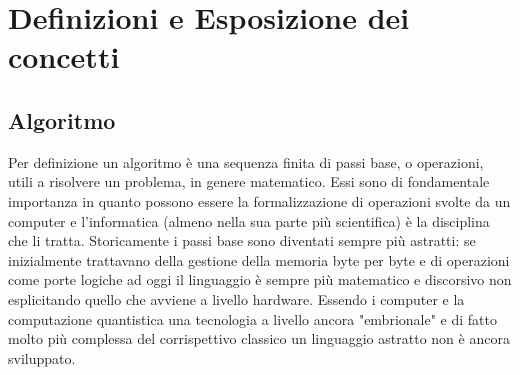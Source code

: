\section{Definizioni e Esposizione dei concetti}
\subsection{Algoritmo}
Per definizione un algoritmo è una sequenza finita di passi base, o operazioni, utili a risolvere un problema, in genere matematico. Essi sono di fondamentale importanza in quanto possono essere la formalizzazione di operazioni svolte da un computer e l'informatica (almeno nella sua parte più scientifica) è la disciplina che li tratta. Storicamente i passi base sono diventati sempre più astratti: se inizialmente trattavano della gestione della memoria byte per byte e di operazioni come porte logiche ad oggi il linguaggio è sempre più matematico e discorsivo non esplicitando quello che avviene a livello hardware. Essendo i computer e la computazione quantistica una tecnologia a livello ancora "embrionale" e di fatto molto più complessa del corrispettivo classico un linguaggio astratto non è ancora sviluppato.
